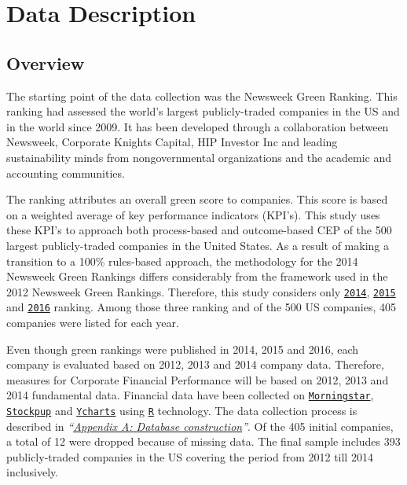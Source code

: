 \documentclass[12pt,]{article}
\begin{document}
\FloatBarrier
\newpage
{}

\section{Data Description}\label{data-description}

\subsection{Overview}\label{overview}

The starting point of the data collection was the Newsweek Green
Ranking. This ranking had assessed the world's largest publicly-traded
companies in the US and in the world since 2009. It has been developed
through a collaboration between Newsweek, Corporate Knights Capital, HIP
Investor Inc and leading sustainability minds from nongovernmental
organizations and the academic and accounting communities.

The ranking attributes an overall green score to companies. This score
is based on a weighted average of key performance indicators (KPI's).
This study uses these KPI's to approach both process-based and
outcome-based CEP of the 500 largest publicly-traded companies in the
United States. As a result of making a transition to a 100\% rules-based
approach, the methodology for the 2014 Newsweek Green Rankings differs
considerably from the framework used in the 2012 Newsweek Green
Rankings. Therefore, this study considers only
\href{http://www.newsweek.com/green/worlds-greenest-companies-2014}{\texttt{2014}},
\href{http://www.newsweek.com/green-2015/top-green-companies-world-2015}{\texttt{2015}}
and
\href{http://www.newsweek.com/green-2016/top-green-companies-world-2016}{\texttt{2016}}
ranking. Among those three ranking and of the 500 US companies, 405
companies were listed for each year.

Even though green rankings were published in 2014, 2015 and 2016, each
company is evaluated based on 2012, 2013 and 2014 company data.
Therefore, measures for Corporate Financial Performance will be based on
2012, 2013 and 2014 fundamental data. Financial data have been collected
on
\href{http://www.morningstar.be/be/default.aspx}{\texttt{Morningstar}},
\href{http://www.stockpup.com/}{\texttt{Stockpup}} and
\href{https://ycharts.com/}{\texttt{Ycharts}} using
\href{https://cran.r-project.org/}{\texttt{R}} technology. The data
collection process is described in
\emph{``\protect\hyperlink{appendix-a-database-construction}{Appendix A:
Database construction}''}. Of the 405 initial companies, a total of 12
were dropped because of missing data. The final sample includes 393
publicly-traded companies in the US covering the period from 2012 till
2014 inclusively.
\end{document}

